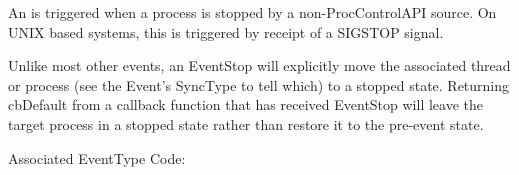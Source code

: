 
An  is triggered when a process is stopped by a
non-ProcControlAPI source. On UNIX based systems, this is triggered by receipt
of a SIGSTOP signal.

Unlike most other events, an EventStop will explicitly move the associated
thread or process (see the Event's SyncType to tell which) to a stopped state.
Returning cbDefault from a callback function that has received EventStop will
leave the target process in a stopped state rather than restore it to the
pre-event state.

Associated EventType Code: 
